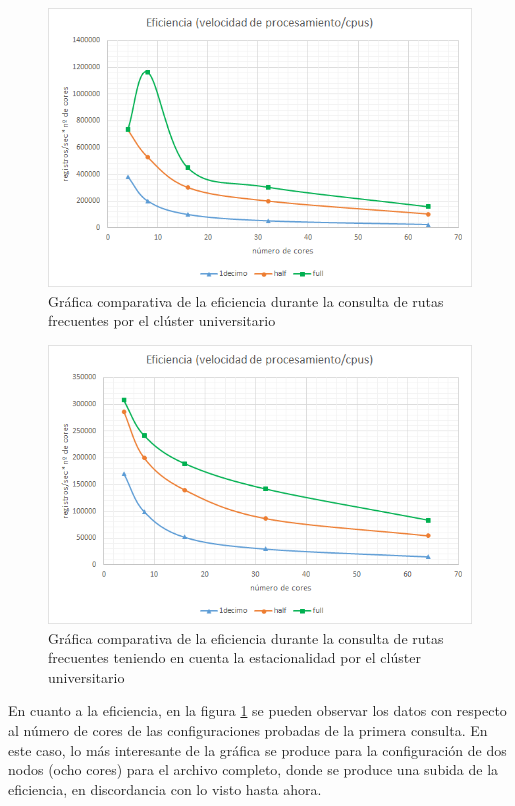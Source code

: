 \begin{figure}[htp!]
	\centering
	\caption{Gráfica comparativa de la eficiencia durante la consulta de rutas frecuentes por el clúster universitario}
	\label{gra:efiFreqUni}
	\vspace{5pt}
	\includegraphics[scale=0.9]{graficas/efuni2}
\end{figure}
\begin{figure}[htp!]
	\centering
	\caption{Gráfica comparativa de la eficiencia durante la consulta de rutas frecuentes teniendo en cuenta la estacionalidad por el clúster universitario}
	\label{gra:efiFreqDayUni}
	\vspace{5pt}
	\includegraphics[scale=0.9]{graficas/efduni2}
\end{figure}

En cuanto a la eficiencia, en la figura \ref{gra:efiFreqUni} se pueden observar los datos con respecto al número de cores de las configuraciones probadas de la primera consulta. En este caso, lo más interesante de la gráfica se produce para la configuración de dos nodos (ocho cores) para el archivo completo, donde se produce una subida de la eficiencia, en discordancia con lo visto hasta ahora.

